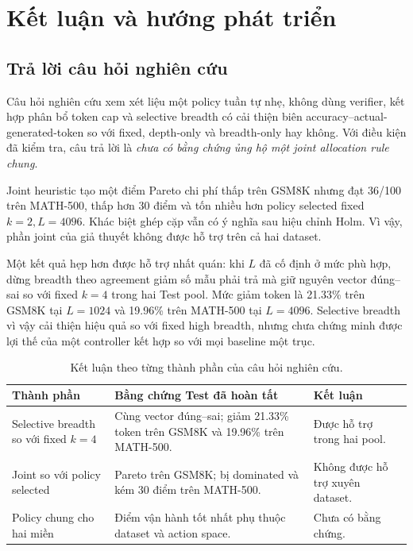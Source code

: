 \chapter{Kết luận và hướng phát triển}
\label{chap:conclusion}

\section{Trả lời câu hỏi nghiên cứu}

Câu hỏi nghiên cứu xem xét liệu một policy tuần tự nhẹ, không dùng verifier,
kết hợp phân bổ token cap và selective breadth có cải thiện biên
accuracy--actual-generated-token so với fixed, depth-only và breadth-only hay
không. Với điều kiện đã kiểm tra, câu trả lời là \emph{chưa có bằng chứng ủng hộ
một joint allocation rule chung}.

Joint heuristic tạo một điểm Pareto chi phí thấp trên GSM8K nhưng đạt 36/100
trên MATH-500, thấp hơn 30 điểm và tốn nhiều hơn policy selected fixed
$k=2,L=4096$. Khác biệt ghép cặp vẫn có ý nghĩa sau hiệu chỉnh Holm. Vì vậy,
phần joint của giả thuyết không được hỗ trợ trên cả hai dataset.

Một kết quả hẹp hơn được hỗ trợ nhất quán: khi $L$ đã cố định ở mức phù hợp,
dừng breadth theo agreement giảm số mẫu phải trả mà giữ nguyên vector
đúng--sai so với fixed $k=4$ trong hai Test pool. Mức giảm token là 21.33\%
trên GSM8K tại $L=1024$ và 19.96\% trên MATH-500 tại $L=4096$. Selective
breadth vì vậy cải thiện hiệu quả so với fixed high breadth, nhưng chưa chứng
minh được lợi thế của một controller kết hợp so với mọi baseline một trục.

\begin{table}[htbp]
  \centering
  \caption{Kết luận theo từng thành phần của câu hỏi nghiên cứu.}
  \label{tab:rq-answer}
  \small
  \begin{tabular}{p{}p{}p{}}
    \toprule
    Thành phần & Bằng chứng Test đã hoàn tất & Kết luận \\
    \midrule
    Selective breadth so với fixed $k=4$ &
    Cùng vector đúng--sai; giảm 21.33\% token trên GSM8K và 19.96\% trên
    MATH-500. & Được hỗ trợ trong hai pool. \\
    Joint so với policy selected &
    Pareto trên GSM8K; bị dominated và kém 30 điểm trên MATH-500. &
    Không được hỗ trợ xuyên dataset. \\
    Policy chung cho hai miền &
    Điểm vận hành tốt nhất phụ thuộc dataset và action space. &
    Chưa có bằng chứng. \\
    \bottomrule
  \end{tabular}
\end{table}

